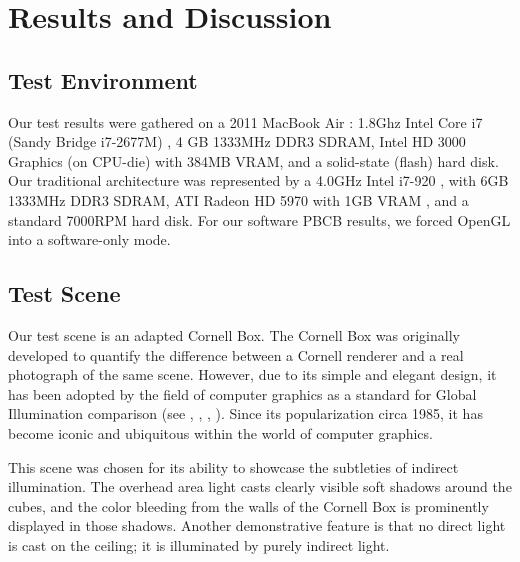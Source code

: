 \chapter{Results and Discussion}
\label{ch:results}

\section{Test Environment}
Our test results were gathered on a 2011 MacBook Air \cite{bib:mba}: 1.8Ghz Intel Core i7 (Sandy Bridge i7-2677M) \cite{bib:sandy_bridge}, 4 GB 1333MHz DDR3 SDRAM, Intel HD 3000 Graphics (on CPU-die) with 384MB VRAM, and a solid-state (flash) hard disk. Our traditional architecture was represented by a 4.0GHz Intel i7-920 \cite{bib:i7-920}, with 6GB 1333MHz DDR3 SDRAM, ATI Radeon HD 5970 with 1GB VRAM \cite{bib:ati5870}, and a standard 7000RPM hard disk. For our software PBCB results, we forced OpenGL into a software-only mode.

\section{Test Scene}
Our test scene is an adapted Cornell Box. The Cornell Box was originally developed to quantify the difference between a Cornell renderer \cite{bib:cornell_box} and a real photograph of the same scene. However, due to its simple and elegant design, it has been adopted by the field of computer graphics as a standard for Global Illumination comparison (see \cite{bib:cornell_box_reference1}, \cite{bib:cornell_box_reference2}, \cite{bib:cornell_box_reference3}, \cite{bib:cornell_box_reference4}). Since its popularization circa 1985, it has become iconic and ubiquitous within the world of computer graphics.

This scene was chosen for its ability to showcase the subtleties of indirect illumination. The overhead area light casts clearly visible soft shadows around the cubes, and the color bleeding from the walls of the Cornell Box is prominently displayed in those shadows. Another demonstrative feature is that no direct light is cast on the ceiling; it is illuminated by purely indirect light.


